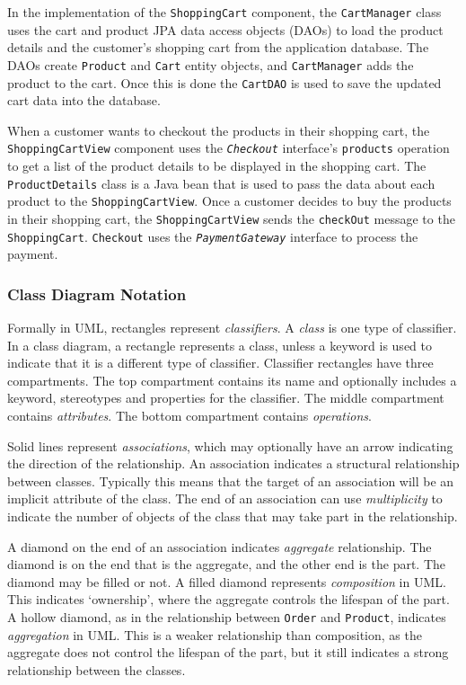 In the implementation of the \texttt{ShoppingCart} component,
the \texttt{CartManager} class uses the cart and product JPA data access objects (DAOs)
to load the product details and the customer's shopping cart from the application database.
The DAOs create \texttt{Product} and \texttt{Cart} entity objects, and \texttt{CartManager} adds the product to the cart.
Once this is done the \texttt{CartDAO} is used to save the updated cart data into the database.

When a customer wants to checkout the products in their shopping cart, the \texttt{ShoppingCartView} component
uses the \texttt{\textsl{Checkout}} interface's \texttt{products} operation to get a list of the product details to be displayed in the shopping cart.
The \texttt{ProductDetails} class is a Java bean that is used to pass the data about each product to the \texttt{ShoppingCartView}.
Once a customer decides to buy the products in their shopping cart,
the \texttt{ShoppingCartView} sends the \texttt{checkOut} message to the \texttt{ShoppingCart}.
\texttt{Checkout} uses the \texttt{\textsl{PaymentGateway}} interface to process the payment.

\subsubsection{Class Diagram Notation}\label{sec:classNotation}
Formally in UML, rectangles represent \emph{classifiers}. A \emph{class} is one type of classifier.
In a class diagram, a rectangle represents a class, unless a keyword is used to indicate that it is a different type of classifier.
Classifier rectangles have three compartments.
The top compartment contains its name and optionally includes a keyword, stereotypes and properties for the classifier.
The middle compartment contains \emph{attributes}.
The bottom compartment contains \emph{operations}.

Solid lines represent \emph{associations}, which may optionally have an arrow indicating the direction of the relationship.
An association indicates a structural relationship between classes.
Typically this means that the target of an association will be an implicit attribute of the class.
The end of an association can use \emph{multiplicity} to indicate the number of objects of the class that may take part in the relationship.

\noindent
A diamond on the end of an association indicates \emph{aggregate} relationship.
The diamond is on the end that is the aggregate, and the other end is the part.
The diamond may be filled or not. A filled diamond represents \emph{composition} in UML.
This indicates `ownership', where the aggregate controls the lifespan of the part.
A hollow diamond, as in the relationship between \texttt{Order} and \texttt{Product},
indicates \emph{aggregation} in UML.
This is a weaker relationship than composition, as the aggregate does not control the lifespan of the part,
but it still indicates a strong relationship between the classes.

